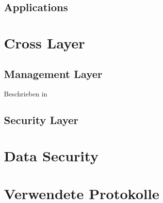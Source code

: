 \subsection{Applications}


\section{Cross Layer}
\subsection{Management Layer}
Beschrieben in \cite{etsi1027232}

\subsection{Security Layer}


\section{Data Security}

\section{Verwendete Protokolle}



